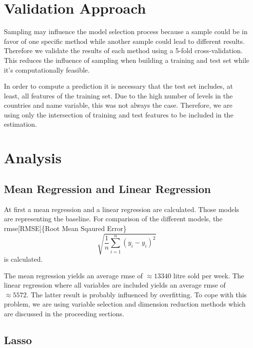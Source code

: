 \documentclass[11pt,]{article}
\begin{document}
\hypertarget{validation-approach}{%
\section{Validation Approach}\label{validation-approach}}

Sampling may influence the model selection process because a sample
could be in favor of one specific method while another sample could lead
to different results. Therefore we validate the results of each method
using a 5-fold cross-validation. This reduces the influence of sampling
when building a training and test set while it's computationally
feasible.

In order to compute a prediction it is necessary that the test set
includes, at least, all features of the training set. Due to the high
number of levels in the countries and name variable, this was not always
the case. Therefore, we are using only the intersection of training and
test features to be included in the estimation.

\hypertarget{analysis}{%
\section{Analysis}\label{analysis}}

\hypertarget{mean-regression-and-linear-regression}{%
\subsection{Mean Regression and Linear
Regression}\label{mean-regression-and-linear-regression}}

At first a mean regression and a linear regression are calculated. Those
models are representing the baseline. For comparison of the different
models, the \ac{rmse}{[}RMSE{]}\{Root Mean Sqaured Error\}
\[\sqrt{\frac{1}{n}\sum_{i = 1}^{n}\left(y_i-\hat{y}_i\right)^2}\] is
calculated.

The mean regression yields an average \ac{rmse} of \(\approx 13340\)
litre sold per week. The linear regression where all variables are
included yields an average \ac{rmse} of \(\approx 5572\). The latter
result is probably influenced by overfitting. To cope with this problem,
we are using variable selection and dimension reduction methods which
are discussed in the proceeding sections.

\hypertarget{lasso}{%
\subsection{Lasso}\label{lasso}}
\end{document}
